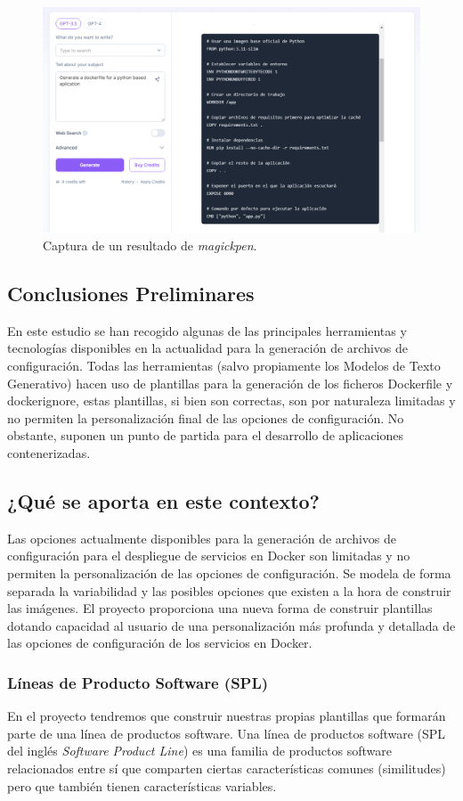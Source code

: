 \documentclass[12pt, a4paper, twoside]{article}
\begin{document}
\begin{figure}[ht]
	\centering
		\includegraphics[width=1\textwidth]{MagickPen.png}
	\caption{Captura de un resultado de \emph{magickpen}.}
\end{figure}


\newpage
\subsection{Conclusiones Preliminares}
En este estudio se han recogido algunas de las principales herramientas y tecnologías disponibles en la actualidad para la generación de archivos de configuración.
Todas las herramientas (salvo propiamente los Modelos de Texto Generativo) hacen uso de plantillas para la generación de los ficheros Dockerfile y dockerignore, estas plantillas, si bien son correctas, son por naturaleza limitadas y no permiten la personalización final de las opciones de configuración.
No obstante, suponen un punto de partida para el desarrollo de aplicaciones contenerizadas. 

\subsection{¿Qué se aporta en este contexto?}
Las opciones actualmente disponibles para la generación de archivos de configuración para el despliegue de servicios en Docker son limitadas y no permiten la personalización de las opciones de configuración.
Se modela de forma separada la variabilidad y las posibles opciones que existen a la hora de construir las imágenes. El proyecto proporciona una nueva forma de construir plantillas dotando capacidad al usuario de una personalización más profunda y detallada de las opciones de configuración de los servicios en Docker.
\subsubsection{Líneas de Producto Software (SPL)}
En el proyecto tendremos que construir nuestras propias plantillas que formarán parte de una línea de productos software.
Una línea de productos software (SPL del inglés \emph{Software Product Line}) es una familia de productos software relacionados entre sí que comparten ciertas características comunes (similitudes) pero que también tienen características variables.
\end{document}
